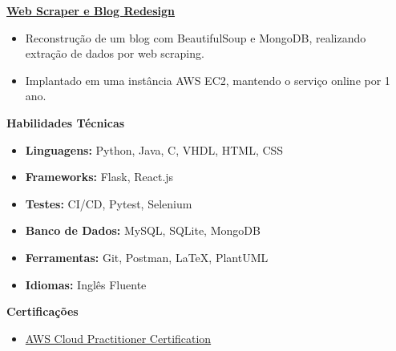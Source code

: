 \documentclass[a4paper,10pt]{article}
\newcommand{\heading}[1]{\noindent\textbf{\Large{#1}}}
\newcommand{\subheading}[1]{\noindent\textbf{\normalsize{#1}}} %
\begin{document}
\noindent
\subheading{\href{https://github.com/luisedu-adf/chycho}{Web Scraper e Blog Redesign}}  
\begin{itemize}[noitemsep]
    \item Reconstrução de um blog com BeautifulSoup e MongoDB, realizando extração de dados por web scraping.
    \item Implantado em uma instância AWS EC2, mantendo o serviço online por 1 ano.
\end{itemize}

\vspace{0.5cm}

\heading{Habilidades Técnicas}
\begin{itemize}[noitemsep]
    \item \textbf{Linguagens:} Python, Java, C, VHDL, HTML, CSS
    \item \textbf{Frameworks:} Flask, React.js
    \item \textbf{Testes:} CI/CD, Pytest, Selenium
    \item \textbf{Banco de Dados:} MySQL, SQLite, MongoDB
    \item \textbf{Ferramentas:} Git, Postman, LaTeX, PlantUML
    \item \textbf{Idiomas:} Inglês Fluente
\end{itemize}

\vspace{0.5cm}



\heading{Certificações}
\begin{itemize}[noitemsep]
    \item \href{https://www.credly.com/badges/fe74fb6a-74be-44ed-be9a-71f450ec811a/linked_in_profile}{AWS Cloud Practitioner Certification}
\end{itemize}
\end{document}
